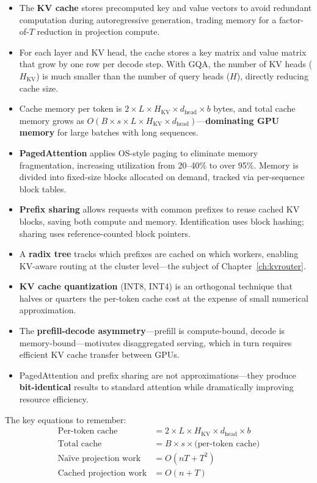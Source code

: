 \begin{itemize}
  \item The \textbf{KV cache} stores precomputed key and value vectors to avoid redundant computation during autoregressive generation, trading memory for a factor-of-$T$ reduction in projection compute.
  \item For each layer and KV head, the cache stores a key matrix and value matrix that grow by one row per decode step. With GQA, the number of KV heads ($H_{\text{KV}}$) is much smaller than the number of query heads ($H$), directly reducing cache size.
  \item Cache memory per token is $2 \times L \times H_{\text{KV}} \times d_{\text{head}} \times b$ bytes, and total cache memory grows as $O(B \times s \times L \times H_{\text{KV}} \times d_{\text{head}})$---\textbf{dominating GPU memory} for large batches with long sequences.
  \item \textbf{PagedAttention} applies OS-style paging to eliminate memory fragmentation, increasing utilization from 20--40\% to over 95\%. Memory is divided into fixed-size blocks allocated on demand, tracked via per-sequence block tables.
  \item \textbf{Prefix sharing} allows requests with common prefixes to reuse cached KV blocks, saving both compute and memory. Identification uses block hashing; sharing uses reference-counted block pointers.
  \item A \textbf{radix tree} tracks which prefixes are cached on which workers, enabling KV-aware routing at the cluster level---the subject of Chapter~\ref{ch:kvrouter}.
  \item \textbf{KV cache quantization} (INT8, INT4) is an orthogonal technique that halves or quarters the per-token cache cost at the expense of small numerical approximation.
  \item The \textbf{prefill-decode asymmetry}---prefill is compute-bound, decode is memory-bound---motivates disaggregated serving, which in turn requires efficient KV cache transfer between GPUs.
  \item PagedAttention and prefix sharing are not approximations---they produce \textbf{bit-identical} results to standard attention while dramatically improving resource efficiency.
\end{itemize}

The key equations to remember:
\begin{align*}
\text{Per-token cache} &= 2 \times L \times H_{\text{KV}} \times d_{\text{head}} \times b \\
\text{Total cache} &= B \times s \times \text{(per-token cache)} \\
\text{Na\"ive projection work} &= O(nT + T^2) \\
\text{Cached projection work} &= O(n + T)
\end{align*}

